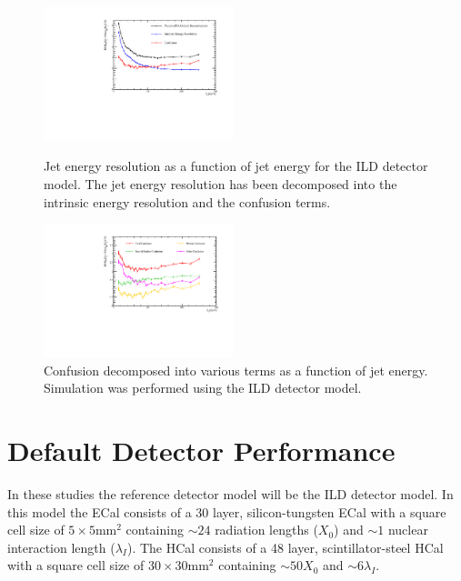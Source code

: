 \documentclass[final,3p,times,twocolumn]{elsarticle}
\begin{document}
\begin{figure}[!h]
  \begin{center}
     \includegraphics[width=0.49\textwidth]{3_Implementation/DetailedPlot.pdf}
     \caption{Jet energy resolution as a function of jet energy for the ILD detector model.  The jet energy resolution has been decomposed into the intrinsic energy resolution and the confusion terms.  \label{2-Decomp}}
  \end{center}
    \begin{center}
     \includegraphics[width=0.49\textwidth]{3_Implementation/Confusion.pdf}
     \caption{Confusion decomposed into various terms as a function of jet energy.  Simulation was performed using the ILD detector model.  \label{2-Conf}}
  \end{center}
\end{figure}


\section{Default Detector Performance}

In these studies the reference detector model will be the ILD detector model.  In this model the ECal consists of a 30 layer, silicon-tungsten ECal with a square cell size of $5\times5\text{mm}^2$ containing $\sim24$ radiation lengths ($X_0$) and $\sim1$ nuclear interaction length ($\lambda_I$).  The HCal consists of a 48 layer, scintillator-steel HCal with a square cell size of $30\times30\text{mm}^2$ containing $\sim50X_0$ and $\sim6\lambda_I$. 
\end{document}
